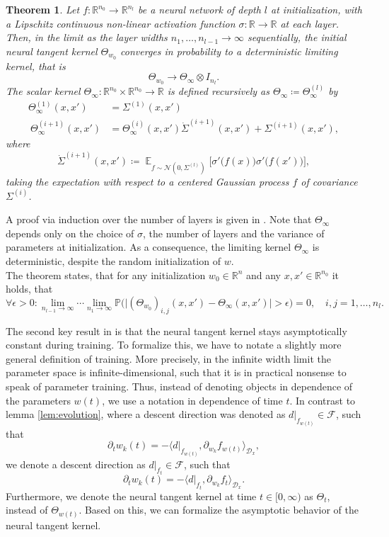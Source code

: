 \documentclass[11pt, a4paper]{article}
\newtheorem{theorem}{Theorem}[section]
\newcommand{\R}{\mathbb{R}}
\newcommand{\D}{\mathcal{D}}
\newcommand{\F}{\mathcal{F}}
\DeclareMathOperator*{\E}{\mathbb{E}}
\begin{document}
\begin{theorem}
Let $f: \R^{n_0} \to \R^{n_l}$ be a neural network of depth $l$ at initialization, with a Lipschitz continuous non-linear activation function $\sigma: \R \to \R$ at each layer. Then, in the limit as the layer widths $n_1, \dots, n_{l-1} \to \infty$ sequentially, the initial neural tangent kernel $\Theta_{w_0}$ converges in probability to a deterministic limiting kernel, that is
\[ \Theta_{w_0} \to \Theta_{\infty} \otimes I_{n_l}. \]
The scalar kernel $\Theta_{\infty} : \R^{n_0} \times \R^{n_0} \to \R$ is defined recursively as $\Theta_{\infty} \coloneq \Theta_{\infty}^{(l)}$ by
\[ \begin{split} 
\Theta_{\infty}^{(1)} (x,x') &= \Sigma^{(1)}(x,x') \\\
\Theta_{\infty}^{(i+1)}(x,x') &= \Theta_{\infty}^{(i)}(x,x') \dot{\Sigma}^{(i+1)}(x,x') + \Sigma^{(i+1)}(x,x'),
\end{split} \]
where 
\[ \dot{\Sigma}^{(i+1)}(x,x') \coloneq \E_{f \sim \mathcal{N}(0, \Sigma^{(l)})} \Big [ \sigma' \big ( f(x) \big ) \sigma' \big ( f(x') \big) \Big ], \]
taking the expectation with respect to a centered Gaussian process $f$ of covariance $\Sigma^{(i)}$.
\end{theorem}

A proof via induction over the number of layers is given in \cite{NTK}. Note that $\Theta_{\infty}$ depends only on the choice of $\sigma$, the number of layers and the variance of parameters at initialization. As a consequence, the limiting kernel $\Theta_{\infty}$ is deterministic, despite the random initialization of $w$. \\

The theorem states, that for any initialization $w_0 \in \R^n$ and any  $x,x' \in \R^{n_0}$ it holds, that
\[ \forall \epsilon > 0 : \lim_{n_{l-1} \to \infty} \cdots \lim_{n_1 \to \infty} \mathbb{P} \Big ( \big | (\Theta_{w_0})_{i,j}(x,x') - \Theta_{\infty}(x,x') \big | > \epsilon \Big ) = 0, \quad i,j=1, \dots, n_l. \]

The second key result in \cite{NTK} is that the neural tangent kernel stays asymptotically constant during training. To formalize this, we have to notate a slightly more general definition of training. More precisely, in the infinite width limit the parameter space is infinite-dimensional, such that it is in practical nonsense to speak of parameter training. Thus, instead of denoting objects in dependence of the parameters $w(t)$, we use a notation in dependence of time $t$. In contrast to lemma \ref{lem:evolution}, where a descent direction was denoted as $d|_{f_{w(t)}} \in \F$, such that 
\[ \partial_tw_k(t) = - \big \langle d|_{f_{w(t)}}, \partial_{w_k} f_{w(t)} \big \rangle_{\D_x}, \]
we denote a descent direction as $d|_{f_t} \in \F$, such that
\[ \partial_tw_k(t) = - \big \langle d|_{f_t}, \partial_{w_k} f_t \big \rangle_{\D_x}. \]
Furthermore, we denote the neural tangent kernel at time $t \in [0, \infty)$ as $\Theta_t$, instead of $\Theta_{w(t)}$. Based on this, we can formalize the asymptotic behavior of the neural tangent kernel.
\end{document}
